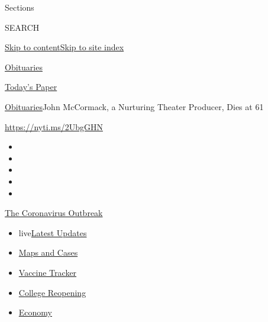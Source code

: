 Sections

SEARCH

\protect\hyperlink{site-content}{Skip to
content}\protect\hyperlink{site-index}{Skip to site index}

\href{https://www.nytimes.com/section/obituaries}{Obituaries}

\href{https://myaccount.nytimes.com/auth/login?response_type=cookie\&client_id=vi}{}

\href{https://www.nytimes.com/section/todayspaper}{Today's Paper}

\href{/section/obituaries}{Obituaries}\textbar{}John McCormack, a
Nurturing Theater Producer, Dies at 61

\url{https://nyti.ms/2UbgGHN}

\begin{itemize}
\item
\item
\item
\item
\item
\end{itemize}

\href{https://www.nytimes.com/news-event/coronavirus?action=click\&pgtype=Article\&state=default\&region=TOP_BANNER\&context=storylines_menu}{The
Coronavirus Outbreak}

\begin{itemize}
\tightlist
\item
  live\href{https://www.nytimes.com/2020/08/03/world/coronavirus-covid-19.html?action=click\&pgtype=Article\&state=default\&region=TOP_BANNER\&context=storylines_menu}{Latest
  Updates}
\item
  \href{https://www.nytimes.com/interactive/2020/us/coronavirus-us-cases.html?action=click\&pgtype=Article\&state=default\&region=TOP_BANNER\&context=storylines_menu}{Maps
  and Cases}
\item
  \href{https://www.nytimes.com/interactive/2020/science/coronavirus-vaccine-tracker.html?action=click\&pgtype=Article\&state=default\&region=TOP_BANNER\&context=storylines_menu}{Vaccine
  Tracker}
\item
  \href{https://www.nytimes.com/2020/08/02/us/covid-college-reopening.html?action=click\&pgtype=Article\&state=default\&region=TOP_BANNER\&context=storylines_menu}{College
  Reopening}
\item
  \href{https://www.nytimes.com/live/2020/08/03/business/stock-market-today-coronavirus?action=click\&pgtype=Article\&state=default\&region=TOP_BANNER\&context=storylines_menu}{Economy}
\end{itemize}

